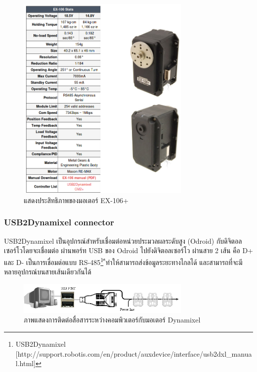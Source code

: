 \begin{figure}[!ht]
    \centering
    \includegraphics[width=0.75\textwidth]{chapter3/images/dxl_ex106.png}
    \caption{แสดงประสิทธิภาพของมอเตอร์ EX-106+}
    \label{fig:dxl_ex106}
\end{figure}


\clearpage
\subsubsection*{USB2Dynamixel connector}
USB2Dynamixel เป็นอุปกรณ์สำหรับเชื่อมต่อหน่วยประมวลผลระดับสูง (Odroid) กับดิจิตอลเซอร์โวโดยจะเชื่อมต่อ ผ่านพอร์ท USB ของ Odroid ไปยังดิจิตอลเซอร์โว
ผ่านสาย 2 เส้น คือ D+ และ D-
เป็นการเชื่อมต่อแบบ RS-485\footnote{USB2Dynamixel [http://support.robotis.com/en/product/auxdevice/interface/usb2dxl\_manual.html]}
ืทำให้สามารถส่งข้อมูลระยะทางไกลได้ และสามารถที่จะมีหลายอุปกรณ์บนสายเส้นเดียวกันได้

\begin{figure}[!ht]
    \centering
    \includegraphics[width=0.75\textwidth]{chapter3/images/dynamixel2pc.png}
    \caption{ภาพแสดงการติดต่อสื่อสารระหว่างคอมพิวเตอร์กับมอเตอร์ Dynamixel}
    \label{fig:dynamixel2pc}
\end{figure}

